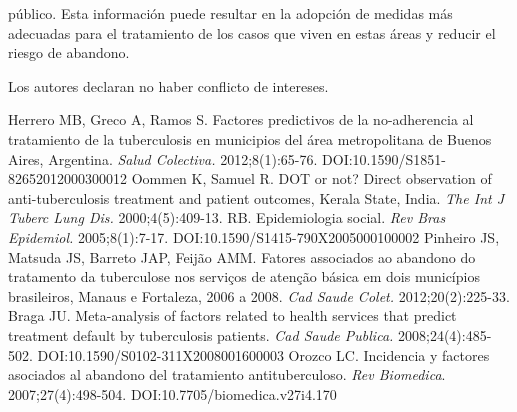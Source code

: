 \begin{multicols}{2}
público.\allowbreak{} Esta información puede resultar en la adopción de medidas más adecuadas para el tratamiento de los casos que viven en estas áreas y reducir el riesgo de abandono.\allowbreak{}

\medskip\par\noindent
{}Los autores declaran no haber conflicto de intereses.\allowbreak{}
\begin{biblio}[REFERENCES]
\allowbreak{} Herrero MB,\allowbreak{} Greco A,\allowbreak{} Ramos S.\allowbreak{} Factores predictivos de la no-\allowbreak{}adherencia al tratamiento de la tuberculosis en municipios del área metropolitana de Buenos Aires,\allowbreak{} Argentina.\allowbreak{} \textit{Salud Colectiva.\allowbreak{} }2012;8(\allowbreak{}1)\allowbreak{}:\allowbreak{}65-\allowbreak{}76.\allowbreak{} DOI:\allowbreak{}10.\allowbreak{}1590\fshyp{}S1851-\allowbreak{}82652012000300012
\allowbreak{} Oommen K,\allowbreak{} Samuel R.\allowbreak{} DOT or not? Direct observation of anti-\allowbreak{}tuberculosis treatment and patient outcomes,\allowbreak{} Kerala State,\allowbreak{} India.\allowbreak{} \textit{The Int J Tuberc Lung Dis.\allowbreak{}} 2000;4(\allowbreak{}5)\allowbreak{}:\allowbreak{}409-\allowbreak{}13.\allowbreak{}
RB.\allowbreak{} Epidemiologia social.\allowbreak{} \textit{Rev Bras Epidemiol.\allowbreak{} }2005;8(\allowbreak{}1)\allowbreak{}:\allowbreak{}7-\allowbreak{}17.\allowbreak{} DOI:\allowbreak{}10.\allowbreak{}1590\fshyp{}S1415-\allowbreak{}790X2005000100002
\allowbreak{} Pinheiro JS,\allowbreak{} Matsuda JS,\allowbreak{} Barreto JAP,\allowbreak{} Feijão AMM.\allowbreak{} Fatores associados ao abandono do tratamento da tuberculose nos serviços de atenção básica em dois municípios brasileiros,\allowbreak{} Manaus e Fortaleza,\allowbreak{} 2006 a 2008.\allowbreak{} \textit{Cad Saude Colet.\allowbreak{}} 2012;20(\allowbreak{}2)\allowbreak{}:\allowbreak{}225-\allowbreak{}33.\allowbreak{}
\allowbreak{} Braga JU.\allowbreak{} Meta-\allowbreak{}analysis of factors related to health services that predict treatment default by tuberculosis patients.\allowbreak{} \textit{Cad Saude Publica.\allowbreak{}} 2008;24(\allowbreak{}4)\allowbreak{}:\allowbreak{}485-\allowbreak{}502.\allowbreak{} DOI:\allowbreak{}10.\allowbreak{}1590\fshyp{}S0102-\allowbreak{}311X2008001600003
\allowbreak{} Orozco LC.\allowbreak{} Incidencia y factores asociados al abandono del tratamiento antituberculoso.\allowbreak{} \textit{Rev Biomedica}.\allowbreak{} 2007;27(\allowbreak{}4)\allowbreak{}:\allowbreak{}498-\allowbreak{}504.\allowbreak{} DOI:\allowbreak{}10.\allowbreak{}7705\fshyp{}biomedica.\allowbreak{}v27i4.\allowbreak{}170

\end{biblio}
\end{multicols}
